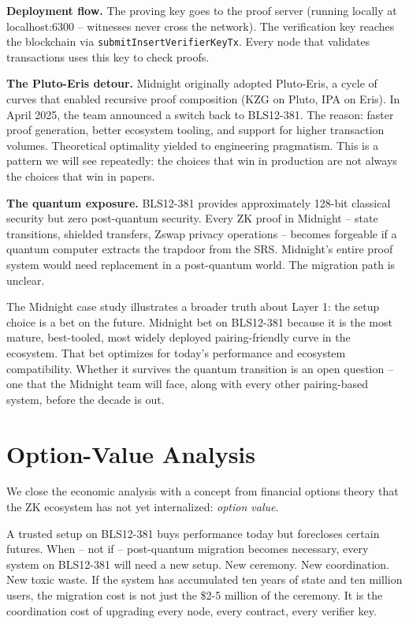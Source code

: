 \documentclass[
  11pt,
  openany]{report}
\renewcommand{\textbf}[1]{{\bfseries\color{MidnightBold}#1}}
\begin{document}
\textbf{Deployment flow.} The proving key goes to the proof server (running
locally at localhost:6300 -- witnesses never cross the network). The
verification key reaches the blockchain via \texttt{submitInsertVerifierKeyTx}.
Every node that validates transactions uses this key to check proofs.

\textbf{The Pluto-Eris detour.} Midnight originally adopted Pluto-Eris, a cycle
of curves that enabled recursive proof composition (KZG on Pluto, IPA on Eris).
In April 2025, the team announced a switch back to BLS12-381. The reason: faster
proof generation, better ecosystem tooling, and support for higher transaction
volumes. Theoretical optimality yielded to engineering pragmatism. This is a
pattern we will see repeatedly: the choices that win in production are not
always the choices that win in papers.

\textbf{The quantum exposure.} BLS12-381 provides approximately 128-bit
classical security but zero post-quantum security. Every ZK proof in Midnight --
state transitions, shielded transfers, Zswap privacy operations -- becomes
forgeable if a quantum computer extracts the trapdoor from the SRS. Midnight's
entire proof system would need replacement in a post-quantum world. The
migration path is unclear.

The Midnight case study illustrates a broader truth about Layer 1: the setup
choice is a bet on the future. Midnight bet on BLS12-381 because it is the most
mature, best-tooled, most widely deployed pairing-friendly curve in the
ecosystem. That bet optimizes for today's performance and ecosystem
compatibility. Whether it survives the quantum transition is an open question --
one that the Midnight team will face, along with every other pairing-based
system, before the decade is out.

\section{Option-Value Analysis}\label{option-value-analysis}

We close the economic analysis with a concept from financial options theory that
the ZK ecosystem has not yet internalized: \emph{option value}.

A trusted setup on BLS12-381 buys performance today but forecloses certain
futures. When -- not if -- post-quantum migration becomes necessary, every
system on BLS12-381 will need a new setup. New ceremony. New coordination. New
toxic waste. If the system has accumulated ten years of state and ten million
users, the migration cost is not just the \$2-5 million of the ceremony. It is
the coordination cost of upgrading every node, every contract, every verifier
key.
\end{document}
